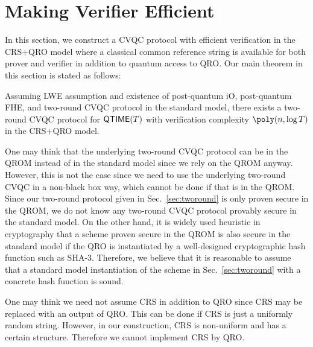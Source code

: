 \section{Making Verifier Efficient}\label{sec:efficient}
In this section, we construct a CVQC protocol with efficient verification in the CRS+QRO model where a classical common reference string is available for both prover and verifier in addition to quantum access to QRO.
Our main theorem in this section is stated as follows:
\begin{theorem}\label{thm:Eff}
Assuming LWE assumption and existence of post-quantum iO, post-quantum FHE, and two-round CVQC protocol in the standard model, there exists a two-round CVQC protocol for $\mathsf{QTIME}(T)$ with verification complexity $\poly(n, \log T)$ in the CRS+QRO model.
\end{theorem}
\begin{remark}
One may think that the underlying two-round CVQC protocol can be in the QROM instead of in the standard model since we rely on the QROM anyway.
However, this is not the case since we need to use the underlying two-round CVQC in a non-black box way, which cannot be done if that is in the QROM.
Since our two-round protocol given in Sec.~\ref{sec:tworound} is only proven secure in the QROM, we do not know any two-round CVQC protocol provably secure in the standard model.
On the other hand, it is widely used heuristic in cryptography that a scheme proven secure in the QROM is also secure in the standard model if the QRO is instantiated by a well-designed cryptographic hash function such as SHA-3. 
Therefore, we believe that it is reasonable to assume that a standard model instantiation of the scheme in  Sec.~\ref{sec:tworound} with a concrete hash function is sound.  
\end{remark}
\begin{remark}
One may think we need not assume CRS in addition to QRO since CRS may be replaced with an output of QRO.
This can be done if CRS is just a uniformly random string.
However, in our construction, CRS is non-uniform and has a certain structure.
Therefore we cannot implement CRS by QRO.
\end{remark}

